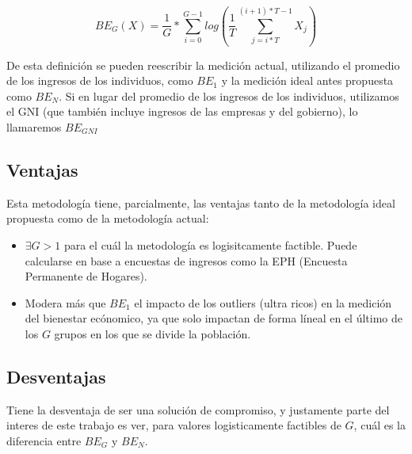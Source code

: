 $$
    BE_G(X) = \frac{1}{G} * \sum_{i=0}^{G-1}log(\frac{1}{T} \sum_{j=i*T}^{(i+1)*T-1}X_j)
$$

De esta definición se pueden reescribir la medición actual, utilizando el promedio de los ingresos de los individuos, como $BE_1$ y la medición ideal antes propuesta como $BE_N$. Si en lugar del promedio de los ingresos de los individuos, utilizamos el GNI (que también incluye ingresos de las empresas y del gobierno), lo llamaremos $BE_{GNI}$

\subsection{Ventajas}

Esta metodología tiene, parcialmente, las ventajas tanto de la metodología ideal propuesta como de la metodología actual:

\begin{itemize}
    \item $\exists G>1$ para el cuál la metodología es logisitcamente factible. Puede calcularse en base a encuestas de ingresos como la EPH (Encuesta Permanente de Hogares).
    \item Modera más que $BE_1$ el impacto de los outliers (ultra ricos) en la medición del bienestar ecónomico, ya que solo impactan de forma líneal en el último de los $G$ grupos en los que se divide la población.
\end{itemize}

\subsection{Desventajas}

Tiene la desventaja de ser una solución de compromiso, y justamente parte del interes de este trabajo es ver, para valores logisticamente factibles de $G$, cuál es la diferencia entre $BE_G$ y $BE_N$.
